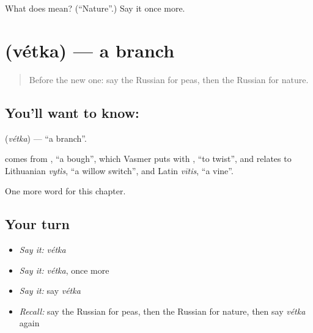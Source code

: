 \begin{tcolorbox}[breakable,colback=teal!4,colframe=teal!35!black,title={Before you move on}]
What does  mean? (\textquotedblleft{}Nature\textquotedblright{}.) Say it once more.
\end{tcolorbox}
\section[\texorpdfstring{\ru{ветка} (vétka)}{ветка (vétka)}]{ (vétka) — a branch}

\label{lesson:RU-C195-vetka}



\begin{quote}
Before the new one: say the Russian for peas, then the Russian for nature.
\end{quote}

\subsection*{You'll want to know: }
\textbf{} (\emph{vétka}) — \textquotedblleft{}a branch\textquotedblright{}.

\begin{cousinweb}
\textbf{} comes from \emph{}, \textquotedblleft{}a bough\textquotedblright{}, which Vasmer puts with \emph{}, \textquotedblleft{}to twist\textquotedblright{}, and relates to Lithuanian \emph{vytìs}, \textquotedblleft{}a willow switch\textquotedblright{}, and Latin \emph{vītis}, \textquotedblleft{}a vine\textquotedblright{}.
\end{cousinweb}

\begin{grammarlens}[title={What you've built}]
One more word for this chapter.
\end{grammarlens}

\subsection*{Your turn}
\begin{itemize}
\raggedright
  \item \emph{Say it:} \emph{vétka}
  \item \emph{Say it:} \emph{vétka}, once more
  \item \emph{Say it:} say \emph{vétka}
  \item \emph{Recall:} say the Russian for peas, then the Russian for nature, then say \emph{vétka} again
\end{itemize}

